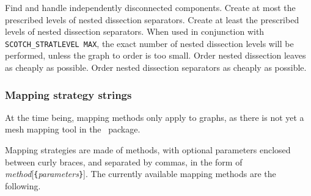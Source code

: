 \begin{itemize}
Find and handle independently disconnected components.
Create at most the prescribed levels of nested dissection separators.
Create at least the prescribed levels of nested dissection separators.
When used in conjunction with {\tt SCOTCH\_\lbt STRAT\lbt LEVEL\lbt
MAX}, the exact number of nested dissection levels will be performed,
unless the graph to order is too small.
Order nested dissection leaves as cheaply as possible.
Order nested dissection separators as cheaply as possible.
\end{itemize}

\subsubsection{Mapping strategy strings}
\label{sec-lib-format-map}

At the time being, mapping methods only apply to graphs, as there is
not yet a mesh mapping tool in the \scotch\ package.

Mapping strategies are made of methods, with optional parameters enclosed
between curly braces, and separated by commas, in the form of
{\it method\/}{[{\tt \{}{\it parameters\/}{\tt \}}]}\enspace.
The currently available mapping methods are the following.

